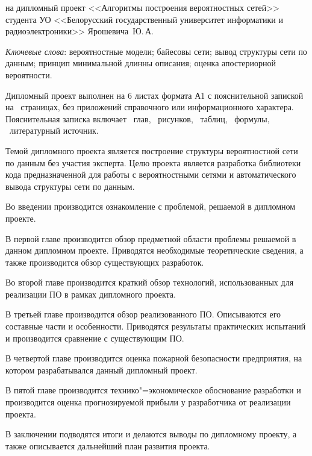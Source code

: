 \thispagestyle{empty}

\begin{center}
  \begin{minipage}{0.82\textwidth}
    на дипломный проект <<Алгоритмы построения вероятностных сетей>> студента УО <<Белорусский государственный университет информатики и радиоэлектроники>> Ярошевича~Ю.\,А.
  \end{minipage}
\end{center}

\emph{Ключевые слова}: вероятностные модели; байесовы сети; вывод структуры сети по данным; принцип минимальной длинны описания; оценка апостериорной вероятности.

\vspace{4\parsep}

Дипломный проект выполнен на 6 листах формата А1 с пояснительной запиской на~\pageref*{LastPage} страницах, без приложений справочного или информационного характера. 
Пояснительная записка включает ~глав, \totfig{}~рисунков, \tottab{}~таблиц, \toteq{}~формулы, \totref{}~литературный источник.

Темой дипломного проекта является построение структуры вероятностной сети по данным без участия эксперта.
Целю проекта является разработка библиотеки кода предназначенной для работы с вероятностными сетями и автоматического вывода структуры сети по данным.

Во введении производится ознакомление с проблемой, решаемой в дипломном проекте.

В первой главе производится обзор предметной области проблемы решаемой в данном дипломном проекте.
Приводятся необходимые теоретические сведения, а также производится обзор существующих разработок.

Во второй главе производится краткий обзор технологий, использованных для реализации ПО в рамках дипломного проекта.

В третьей главе производится обзор реализованного ПО.
Описываются его составные части и особенности.
Приводятся результаты практических испытаний и производится сравнение с существующим ПО.

В четвертой главе производится оценка пожарной безопасности предприятия, на котором разрабатывался данный дипломный проект.

В пятой главе производится технико"=экономическое обоснование разработки и производится оценка прогнозируемой прибыли у разработчика от реализации проекта.

В заключении подводятся итоги и делаются выводы по дипломному проекту, а также описывается дальнейший план развития проекта.

\clearpage